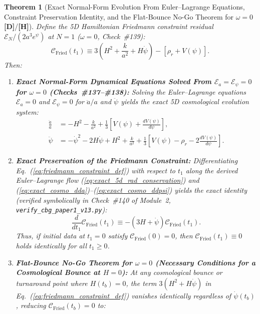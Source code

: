 \documentclass[11pt,a4paper]{article}
\newcommand{\catD}{\textbf{\textcolor{blue!75!black}{[D]}}}
\newcommand{\catH}{\textbf{\textcolor{orange!85!black}{[H]}}}
\newtheorem{theorem}{Theorem}[section]
\theoremstyle{definition}
\theoremstyle{remark}
\begin{document}
\begin{theorem}[Exact Normal-Form Evolution From Euler--Lagrange Equations, Constraint Preservation Identity, and the Flat-Bounce No-Go Theorem for $\omega = 0$ \catD/\catH]
\label{thm:friedmann_bounce_obstruction}
Define the 5D Hamiltonian Friedmann constraint residual $\mathcal{E}_N/(2a^3 e^\psi)$ at $N = 1$ ($\omega = 0$, Check~\#139):
\begin{equation}
  \mathcal{C}_{\text{Fried}}(t_1) \equiv 3\left(H^2 + \frac{k}{a^2} + H\dot{\psi}\right) - \left[\rho_r + V(\psi)\right].
  \label{eq:friedmann_constraint_def}
\end{equation}
Then:
\begin{enumerate}
  \item[\textnormal{(i)}] \textbf{Exact Normal-Form Dynamical Equations Solved From $\mathcal{E}_a = \mathcal{E}_\psi = 0$ for $\omega = 0$ (Checks~\#137--\#138):} Solving the Euler--Lagrange equations $\mathcal{E}_a = 0$ and $\mathcal{E}_\psi = 0$ for $\ddot{a}/a$ and $\ddot{\psi}$ yields the exact 5D cosmological evolution system:
  \begin{align}
    \frac{\ddot{a}}{a} &= -H^2 - \frac{k}{a^2} + \frac{1}{3}\left[V(\psi) + \frac{dV(\psi)}{d\psi}\right], \label{eq:exact_cosmo_dda} \\[4pt]
    \ddot{\psi} &= -\dot{\psi}^2 - 2 H\dot{\psi} + H^2 + \frac{k}{a^2} + \frac{1}{3}\left[V(\psi) - \rho_r - 2\frac{dV(\psi)}{d\psi}\right]. \label{eq:exact_cosmo_ddpsi}
  \end{align}
  \item[\textnormal{(ii)}] \textbf{Exact Preservation of the Friedmann Constraint:} Differentiating Eq.~(\ref{eq:friedmann_constraint_def}) with respect to $t_1$ along the derived Euler--Lagrange flow (\ref{eq:exact_5d_rad_conservation}) and (\ref{eq:exact_cosmo_dda})--(\ref{eq:exact_cosmo_ddpsi}) yields the exact identity (verified symbolically in Check~\#140 of Module~2, \texttt{verify\_cbg\_paper1\_v13.py}):
  \begin{equation}
    \frac{d}{dt_1}\mathcal{C}_{\text{Fried}}(t_1) \equiv -\left(3 H + \dot{\psi}\right)\mathcal{C}_{\text{Fried}}(t_1).
    \label{eq:friedmann_preservation_identity}
  \end{equation}
  Thus, if initial data at $t_1 = 0$ satisfy $\mathcal{C}_{\text{Fried}}(0) = 0$, then $\mathcal{C}_{\text{Fried}}(t_1) \equiv 0$ holds identically for all $t_1 \ge 0$.
  \item[\textnormal{(iii)}] \textbf{Flat-Bounce No-Go Theorem for $\omega = 0$ (Necessary Conditions for a Cosmological Bounce at $H = 0$):} At any cosmological bounce or turnaround point where $H(t_b) = 0$, the term $3(H^2 + H\dot{\psi})$ in Eq.~(\ref{eq:friedmann_constraint_def}) vanishes identically regardless of $\dot{\psi}(t_b)$, reducing $\mathcal{C}_{\text{Fried}}(t_b) = 0$ to:

\end{enumerate}
\end{theorem}
\end{document}

